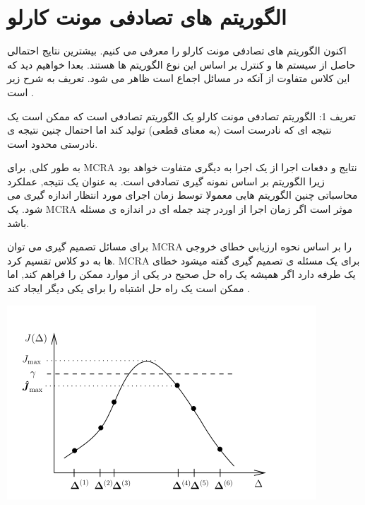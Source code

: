 \documentclass[12pt]{article} %
\begin{document}
   \section{الگوریتم های تصادفی مونت کارلو}
	اکنون الگوریتم های تصادفی مونت کارلو را معرفی می کنیم.
	بیشترین نتایج احتمالی حاصل از سیستم ها و کنترل
	بر اساس این نوع الگوریتم ها هستند.
	بعدا خواهیم دید که
	این کلاس متفاوت از آنکه در مسائل اجماع است ظاهر می شود. تعریف به شرح زیر است \cite{bib17}.
	\par
	تعریف 1: الگوریتم تصادفی مونت کارلو
	یک الگوریتم تصادفی است که ممکن است یک نتیجه ای که نادرست است (به معنای قطعی) تولید کند
	 اما احتمال چنین نتیجه ی نادرستی محدود است.
	\par
	به طور کلی, برای MCRA نتایج و دفعات اجرا
	از یک اجرا به دیگری متفاوت خواهد بود زیرا
   الگوریتم بر اساس نمونه گیری تصادفی است.
   به عنوان یک نتیجه,
   عملکرد محاسباتی چنین الگوریتم هایی معمولا توسط زمان اجرای مورد انتظار
   اندازه گیری می شود. 
   یک MCRA  موثر است اگر زمان  اجرا 
   از اوردر چند جمله ای در اندازه ی مسئله باشد.
   \par
   برای مسائل تصمیم گیری می توان MCRA را بر اساس نحوه ارزیابی خطای خروجی ها به دو کلاس تقسیم کرد.
   MCRA
	برای یک مسئله ی تصمیم گیری گفته میشود خطای یک طرفه دارد 
	اگر همیشه یک راه حل صحیح در یکی از موارد ممکن را فراهم کند, اما ممکن است یک راه حل اشتباه را برای یکی دیگر ایجاد کند \cite{bib17}.
   \begin{center}
	   \includegraphics[width=0.49\linewidth]{1.png}
   \end{center}
   \par  
\end{document}

